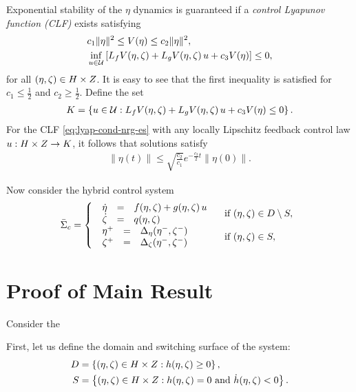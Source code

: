 \documentclass[twocolumn]{article}
\begin{document}
Exponential stability of the $\eta$ dynamics is guaranteed if a {\em control Lyapunov function (CLF)} exists satisfying
\begin{align}
  \label{eq:lyap-cond-nrg-es}
  &c_{1} \| \eta \|^{2} \leq V(\eta) \leq c_{2} \| \eta \|^2,\\
  \nonumber
  &\inf_{u \in \mathcal{U}} \left[ L_{f} V(\eta, \zeta) + L_{g} V(\eta, \zeta) \, u + c_{3} V(\eta) \right] \leq 0,
\end{align}
for all $(\eta, \zeta) \in H \times Z$.
%
It is easy to see that the first inequality is satisfied for $c_{1} \leq \frac{1}{2}$ and $c_{2} \geq \frac{1}{2}$.
%
Define the set
\begin{align}
  K = \left\{ u \in \mathcal{U} : L_{f} V(\eta, \zeta) + L_{g} V(\eta, \zeta) \, u + c_{3} V(\eta) \leq 0 \right\}.
\end{align}
For the CLF \eqref{eq:lyap-cond-nrg-es} with any locally Lipschitz feedback control law $u : H \times Z \to K$, it follows that solutions satisfy
\begin{align*}
  \| \eta(t) \| \leq \sqrt{\frac{c_{2}}{c_{1}}} e^{-\frac{c_{3}}{2} t} \| \eta(0) \|.
\end{align*}

Now consider the hybrid control system
\begin{align}
  \label{eq:hcsys}
  {\bar \Sigma}_{c} = \left\{
  \begin{array}{l l}
    \begin{array}{r c l}
      {\dot \eta} &=& f(\eta, \zeta) + g(\eta, \zeta) \, u\\
      {\dot \zeta} &=& q(\eta, \zeta)
    \end{array} & \mbox{ if } (\eta, \zeta) \in D \setminus S,\\
    \begin{array}{r c l}
      \eta^{+} &=& \Delta_{\eta}(\eta^{-}, \zeta^{-})\\
      \zeta^{+} &=& \Delta_{\zeta}(\eta^{-}, \zeta^{-})
    \end{array} & \mbox{ if } (\eta, \zeta) \in S,
  \end{array}\right.
\end{align}


\section{Proof of Main Result}

Consider the 

First, let us define the domain and switching surface of the system:
\begin{align}
  D &= \left\{ (\eta, \zeta) \in H \times Z : h(\eta, \zeta) \geq 0 \right\},\\
  \nonumber
  S &= \left\{ (\eta, \zeta) \in H \times Z : h(\eta, \zeta) = 0 \mbox{ and } {\dot h}(\eta, \zeta) < 0 \right\}.
\end{align}
\end{document}
